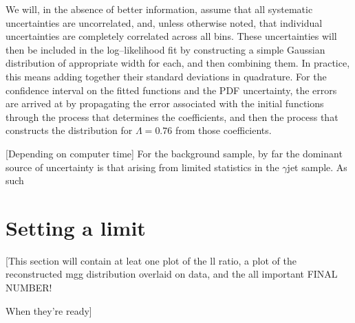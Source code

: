 We will, in the absence of better information, assume that all systematic uncertainties are uncorrelated, and, unless otherwise noted, that individual uncertainties are completely correlated across all bins. These uncertainties will then be included in the log--likelihood fit by constructing a simple Gaussian distribution of appropriate width for each, and then combining them. In practice, this means adding together their standard deviations in quadrature. For the confidence interval on the fitted functions and the PDF uncertainty, the errors are arrived at by propagating the error associated with the initial functions through the process that determines the coefficients, and then the process that constructs the distribution for $\Lambda=0.76$ from those coefficients.

[Depending on computer time]
For the background sample, by far the dominant source of uncertainty is that arising from limited statistics in the $\gamma$jet sample. As such

\section{Setting a limit}
[This section will contain at leat one plot of the ll ratio, a plot of the reconstructed mgg distribution overlaid on data, and the all important FINAL NUMBER!

When they're ready]

